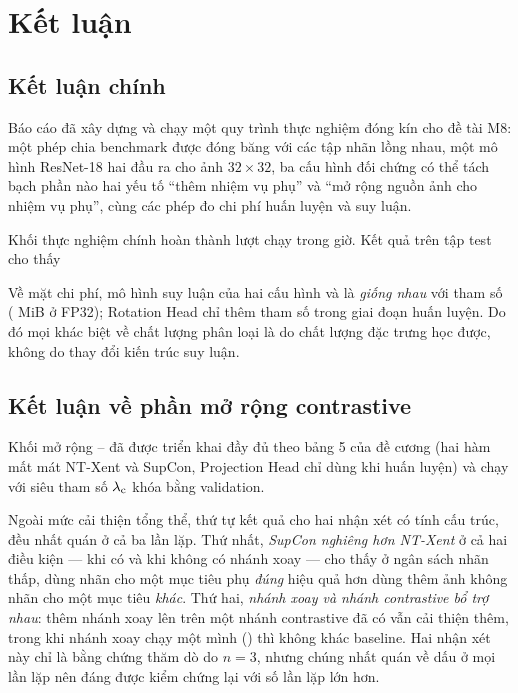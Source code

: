 \section{Kết luận}
\label{sec:conclusion}

\subsection{Kết luận chính}
\label{sec:concl-main}

Báo cáo đã xây dựng và chạy một quy trình thực nghiệm đóng kín cho đề tài M8: một phép chia
benchmark được đóng băng với các tập nhãn lồng nhau, một mô hình ResNet-18 hai đầu ra cho ảnh
$32 \times 32$, ba cấu hình đối chứng có thể tách bạch phần nào hai yếu tố \enquote{thêm nhiệm
vụ phụ} và \enquote{mở rộng nguồn ảnh cho nhiệm vụ phụ}, cùng các phép đo chi phí huấn luyện và
suy luận.

Khối thực nghiệm chính hoàn thành \RRuns{} lượt chạy trong \RTotalHours{} giờ. Kết quả trên tập
test cho thấy \RFindingSentence

Về mặt chi phí, mô hình suy luận của hai cấu hình  và  là \emph{giống nhau} với
\RParamInference{} tham số (\RParamInferenceMiB{} MiB ở FP32); Rotation Head chỉ thêm
\RParamRotationHead{} tham số trong giai đoạn huấn luyện. Do đó mọi khác biệt về chất lượng
phân loại là do chất lượng đặc trưng học được, không do thay đổi kiến trúc suy luận.

\subsection{Kết luận về phần mở rộng contrastive}
\label{sec:concl-ext}

Khối mở rộng -- đã được triển khai đầy đủ theo bảng 5 của đề cương (hai hàm
mất mát NT-Xent và SupCon, Projection Head chỉ dùng khi huấn luyện) và chạy với siêu tham số
$\lambda_{\mathrm{c}}$ khóa bằng validation. \RExtensionConclusion

Ngoài mức cải thiện tổng thể, thứ tự kết quả cho hai nhận xét có tính cấu trúc, đều nhất quán ở
cả ba lần lặp. Thứ nhất, \emph{SupCon nghiêng hơn NT-Xent} ở cả hai điều kiện — khi có và khi
không có nhánh xoay — cho thấy ở ngân sách nhãn thấp, dùng nhãn cho một mục tiêu phụ \emph{đúng}
hiệu quả hơn dùng thêm ảnh không nhãn cho một mục tiêu \emph{khác}. Thứ hai, \emph{nhánh xoay và
nhánh contrastive bổ trợ nhau}: thêm nhánh xoay lên trên một nhánh contrastive đã có vẫn cải
thiện thêm, trong khi nhánh xoay chạy một mình () thì không khác baseline. Hai nhận
xét này chỉ là bằng chứng thăm dò do $n=3$, nhưng chúng nhất quán về dấu ở mọi lần lặp nên đáng
được kiểm chứng lại với số lần lặp lớn hơn.

